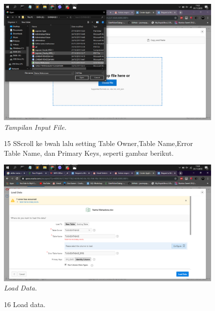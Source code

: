 \begin{enumerate}
\begin{figure}
    \begin{center}
\includegraphics[scale=0.2]{figures/13.png}
    \caption{\textit{Tampilan Input File.}}
        \end{center}
\label{gambar}
\end{figure}

\begin{figure}
\item[15] SScroll ke bwah lalu setting Table Owner,Table Name,Error Table Name, dan Primary Keys, seperti gambar berikut.

    \begin{center}
\includegraphics[scale=0.2]{figures/14.png}
    \caption{\textit{Load Data.}}
        \end{center}
\label{gambar}
\end{figure}

\begin{figure}
\item[16] Load data.


\end{figure}
\end{enumerate}
